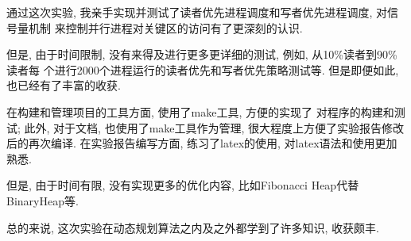 \label{ssub:实验心得}
通过这次实验, 我亲手实现并测试了读者优先进程调度和写者优先进程调度, 对信号量机制
来控制并行进程对关键区的访问有了更深刻的认识.

但是, 由于时间限制, 没有来得及进行更多更详细的测试, 例如, 从10\%读者到90\%读者每
个进行2000个进程运行的读者优先和写者优先策略测试等. 但是即便如此, 也已经有了丰富的收获.

在构建和管理项目的工具方面, 使用了make工具, 方便的实现了
对程序的构建和测试; 此外, 对于文档, 也使用了make工具作为管理,
很大程度上方便了实验报告修改后的再次编译. 在实验报告编写方面,
练习了latex的使用, 对latex语法和使用更加熟悉.\par

但是, 由于时间有限, 没有实现更多的优化内容, 比如Fibonacci Heap代替BinaryHeap等.\par

总的来说, 这次实验在动态规划算法之内及之外都学到了许多知识, 收获颇丰.
